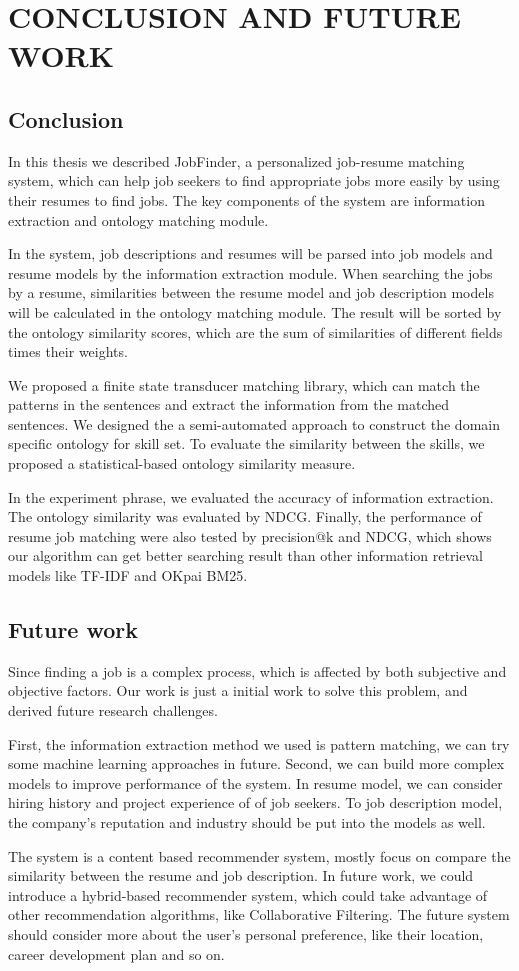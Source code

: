 \chapter{CONCLUSION AND FUTURE WORK}

\section{Conclusion}
In this thesis we described JobFinder, a personalized job-resume matching system, which can help job seekers to find appropriate jobs more easily by using their resumes to find jobs. The key components of the system are information extraction and ontology matching module.

In the system, job descriptions and resumes will be parsed into job models and resume models by the information extraction module. When searching the jobs by a resume, similarities between the resume model and job description models will be calculated in the ontology matching module. The result will be sorted by the ontology similarity scores, which are the sum of similarities of different fields times their weights.

We proposed a finite state transducer matching library, which can match the patterns in the sentences and extract the information from the matched sentences. We designed the a semi-automated approach to construct the domain specific ontology for skill set. To evaluate the similarity between the skills, we proposed a statistical-based ontology similarity measure.

In the experiment phrase, we evaluated the accuracy of information extraction. The ontology similarity was evaluated by NDCG. Finally, the performance of resume job matching were also tested by precision@k and NDCG,  which shows our algorithm can get better searching result than other information retrieval models like TF-IDF and OKpai BM25.


\section{Future work}

Since finding a job is a complex process, which is affected by both subjective and objective factors.  Our work is just a initial work to solve this problem, and derived future research challenges.

First, the information extraction method we used is pattern matching, we can try some machine learning approaches in future. Second, we can build more complex models to improve performance of the system. In resume model, we can consider hiring history and project experience of of job seekers. To job description model, the company's reputation and industry should be put into the models as well.

The system is a content based recommender system, mostly focus on compare the similarity between the resume and job description. In future work, we could introduce a hybrid-based recommender system, which could take advantage of other recommendation algorithms, like Collaborative Filtering. The future system should consider more about the user's personal preference, like their location, career development plan and so on.

